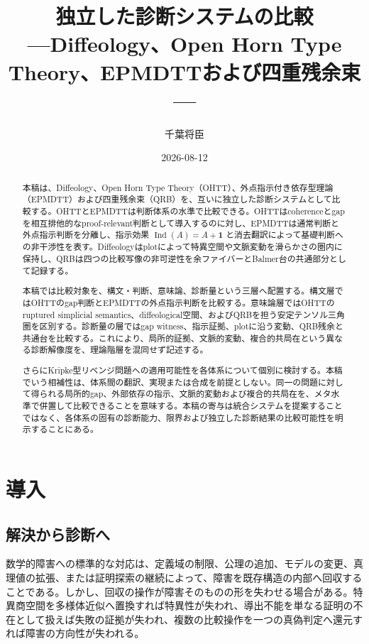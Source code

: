 \documentclass[a4paper,11pt]{ltjsarticle}
\title{独立した診断システムの比較\\[0.2em]
{\large ---Diffeology、Open Horn Type Theory、EPMDTTおよび四重残余束---}}
\author{千葉将臣}
\date{2026-08-12}
\theoremstyle{definition}
\theoremstyle{plain}
\newcommand{\Ind}{\operatorname{Ind}}
\newcommand{\Unit}{\mathbf 1}
\begin{document}
\maketitle

\begin{abstract}
本稿は、Diffeology、Open Horn Type Theory（OHTT）、外点指示付き依存型理論（EPMDTT）および四重残余束（QRB）を、互いに独立した診断システムとして比較する。OHTTとEPMDTTは判断体系の水準で比較できる。OHTTはcoherenceとgapを相互排他的なproof-relevant判断として導入するのに対し、EPMDTTは通常判断と外点指示判断を分離し、指示効果 $\Ind(A)=A+\Unit$ と消去翻訳によって基礎判断への非干渉性を表す。Diffeologyはplotによって特異空間や文脈変動を滑らかさの圏内に保持し、QRBは四つの比較写像の非可逆性を余ファイバーとBalmer台の共通部分として記録する。

本稿では比較対象を、構文・判断、意味論、診断量という三層へ配置する。構文層ではOHTTのgap判断とEPMDTTの外点指示判断を比較する。意味論層ではOHTTのruptured simplicial semantics、diffeological空間、およびQRBを担う安定テンソル三角圏を区別する。診断量の層ではgap witness、指示証拠、plotに沿う変動、QRB残余と共通台を比較する。これにより、局所的証拠、文脈的変動、複合的共局在という異なる診断解像度を、理論階層を混同せず記述する。

さらにKripke型リベンジ問題への適用可能性を各体系について個別に検討する。本稿でいう相補性は、体系間の翻訳、実現または合成を前提としない。同一の問題に対して得られる局所的gap、外部依存の指示、文脈的変動および複合的共局在を、メタ水準で併置して比較できることを意味する。本稿の寄与は統合システムを提案することではなく、各体系の固有の診断能力、限界および独立した診断結果の比較可能性を明示することにある。
\end{abstract}

\tableofcontents

\section{導入}

\subsection{解決から診断へ}

数学的障害への標準的な対応は、定義域の制限、公理の追加、モデルの変更、真理値の拡張、または証明探索の継続によって、障害を既存構造の内部へ回収することである。しかし、回収の操作が障害そのものの形を失わせる場合がある。特異商空間を多様体近似へ置換すれば特異性が失われ、導出不能を単なる証明の不在として扱えば失敗の証拠が失われ、複数の比較操作を一つの真偽判定へ還元すれば障害の方向性が失われる。
\end{document}
